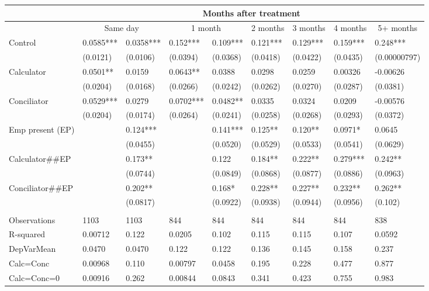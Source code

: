 \begin{tabular}{lllllllll}
      & \multicolumn{8}{c}{Months after treatment} \\
\midrule
      & \multicolumn{2}{c}{Same day} & \multicolumn{2}{c}{1 month} & \multicolumn{1}{c}{2 months} & \multicolumn{1}{c}{3 months} & \multicolumn{1}{c}{4 months} & \multicolumn{1}{c}{5+ months} \\
\midrule
\midrule
Control & 0.0585*** & 0.0358*** & 0.152*** & 0.109*** & 0.121*** & 0.129*** & 0.159*** & 0.248*** \\
      & (0.0121) & (0.0106) & (0.0394) & (0.0368) & (0.0418) & (0.0422) & (0.0435) & (0.00000797) \\
Calculator & 0.0501** & 0.0159 & 0.0643** & 0.0388 & 0.0298 & 0.0259 & 0.00326 & -0.00626 \\
      & (0.0204) & (0.0168) & (0.0266) & (0.0242) & (0.0262) & (0.0270) & (0.0287) & (0.0381) \\
Conciliator & 0.0529*** & 0.0279 & 0.0702*** & 0.0482** & 0.0335 & 0.0324 & 0.0209 & -0.00576 \\
      & (0.0204) & (0.0174) & (0.0264) & (0.0241) & (0.0258) & (0.0268) & (0.0293) & (0.0372) \\
Emp present (EP) &       & 0.124*** &       & 0.141*** & 0.125** & 0.120** & 0.0971* & 0.0645 \\
      &       & (0.0455) &       & (0.0520) & (0.0529) & (0.0533) & (0.0541) & (0.0629) \\
Calculator\#\#EP &       & 0.173** &       & 0.122 & 0.184** & 0.222** & 0.279*** & 0.242** \\
      &       & (0.0744) &       & (0.0849) & (0.0868) & (0.0877) & (0.0886) & (0.0963) \\
Conciliator\#\#EP &       & 0.202** &       & 0.168* & 0.228** & 0.227** & 0.232** & 0.262** \\
      &       & (0.0817) &       & (0.0922) & (0.0938) & (0.0944) & (0.0956) & (0.102) \\
      &       &       &       &       &       &       &       &  \\
\midrule
Observations & 1103  & 1103  & 844   & 844   & 844   & 844   & 844   & 838 \\
R-squared & 0.00712 & 0.122 & 0.0205 & 0.102 & 0.115 & 0.115 & 0.107 & 0.0592 \\
DepVarMean & 0.0470 & 0.0470 & 0.122 & 0.122 & 0.136 & 0.145 & 0.158 & 0.237 \\
Calc=Conc & 0.00968 & 0.110 & 0.00797 & 0.0458 & 0.195 & 0.228 & 0.477 & 0.877 \\
Calc=Conc=0 & 0.00916 & 0.262 & 0.00844 & 0.0843 & 0.341 & 0.423 & 0.755 & 0.983 \\
\bottomrule
\bottomrule
\end{tabular}%

